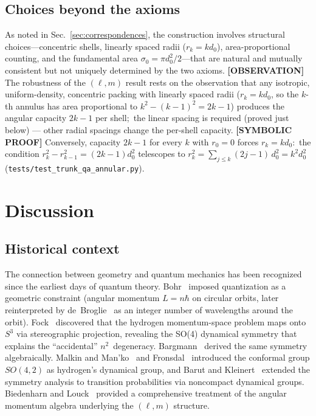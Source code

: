 \documentclass[aps,prl,reprint,amsmath,amssymb]{revtex4-2}
\begin{document}
\subsection{Choices beyond the axioms}

As noted in Sec.~\ref{sec:correspondences}, the construction involves
structural choices---concentric shells, linearly spaced radii
($r_k = k d_0$), area-proportional counting, and the fundamental area
$\sigma_0 = \pi d_0^2 / 2$---that are natural and mutually consistent
but not uniquely determined by the two axioms.  \textbf{[OBSERVATION]} The robustness of the
$(\ell, m)$ result rests on the observation that any isotropic,
uniform-density, concentric packing with linearly spaced radii
($r_k = k d_0$, so the $k$-th annulus has area proportional to
$k^2 - (k-1)^2 = 2k - 1$) produces the angular capacity $2k - 1$ per
shell;\ the linear spacing is required (proved just below) --- other radial spacings change
the per-shell capacity.  \textbf{[SYMBOLIC PROOF]} Conversely, capacity
$2k - 1$ for every $k$ with $r_0 = 0$ forces $r_k = k d_0$:\ the
condition $r_k^2 - r_{k-1}^2 = (2k-1) d_0^2$ telescopes to
$r_k^2 = \sum_{j \le k} (2j-1)\, d_0^2 = k^2 d_0^2$
(\texttt{tests/test\_trunk\_qa\_annular.py}).


\section{Discussion}
\label{sec:discussion}

\subsection{Historical context}

The connection between geometry and quantum mechanics has been
recognized since the earliest days of quantum theory.
Bohr~\cite{bohr1913} imposed quantization as a geometric constraint
(angular momentum $L = n\hbar$ on circular orbits, later reinterpreted
by de~Broglie~\cite{debroglie1925} as an integer number of wavelengths around the orbit).
Fock~\cite{fock1935} discovered that the hydrogen momentum-space
problem maps onto $S^3$ via stereographic projection, revealing the
SO(4) dynamical symmetry that explains the ``accidental''
$n^2$~degeneracy.  Bargmann~\cite{bargmann1936} derived the same
symmetry algebraically.  Malkin and Man'ko~\cite{malkin_manko1965} and
Fronsdal~\cite{fronsdal1967} introduced the conformal group $SO(4,2)$ as
hydrogen's dynamical group, and Barut and Kleinert~\cite{barut1967}
extended the symmetry analysis to transition probabilities via
noncompact dynamical groups.  Biedenharn and Louck~\cite{biedenharn1981}
provided a comprehensive treatment of the angular momentum algebra
underlying the $(\ell, m)$ structure.
\end{document}
